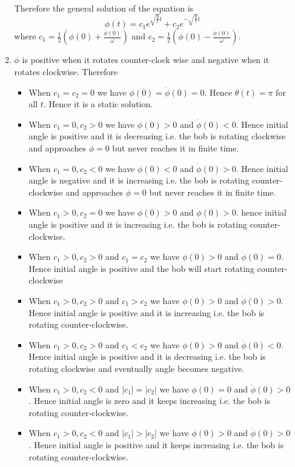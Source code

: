 \documentclass{article}
\begin{document}
\begin{enumerate}
\begin{enumerate}
		\hspace{1cm}Therefore the general solution of the equation is $$\phi(t)=c_1e^{\sqrt{\frac{g}{l}} t}+c_2e^{-\sqrt{\frac{g}{l}} t}$$ where $c_1=\frac12(\phi(0)+\frac{\dot{\phi}(0)}{\omega})$ and $c_2=\frac12(\phi(0)-\frac{\dot{\phi}(0)}{\omega})$.
		\item $\phi$ is positive when it rotates counter-clock wise and negative when it rotates clockwise. Therefore\begin{itemize}
			\item When $c_1=c_2=0$ we have $\phi(0)=\dot{\phi}(0)=0$. Hence $\theta(t)=\pi$  for all $t$. Hence it is a static solution.
			\item When $c_1=0,c_2>0$ we have $\phi(0)>0$ and $\dot{\phi}(0)<0$. Hence initial angle is positive and it is decreasing i.e. the bob is rotating clockwise and approaches $\phi=0$ but never reaches it in finite time.
			\item When $c_1=0,c_2<0$ we have $\phi(0)<0$ and $\dot{\phi}(0)>0$. Hence initial angle is negative and it is increasing i.e. the bob is rotating counter-clockwise and approaches $\phi=0$ but never reaches it in finite time.
			\item When $c_1>0, c_2=0$ we have $\phi(0)>0$ and $\dot{\phi}(0)>0$. hence initial angle is positive and it is increasing i.e. the bob is rotating counter-clockwise.
			\item When $c_1>0, c_2> 0$ and $c_1=c_2$ we have $\phi(0)>0$ and $\dot{\phi}(0)=0$. Hence initial angle is positive and  the bob will start rotating counter-clockwise
			\item When $c_1>0, c_2> 0$ and $c_1> c_2$ we have $\phi(0)>0$ and $\dot{\phi}(0)> 0$. Hence initial angle is positive and it is increasing i.e. the bob is rotating counter-clockwise.
			\item When $c_1>0, c_2> 0$ and $c_1< c_2$ we have $\phi(0)>0$ and $\dot{\phi}(0)<0$. Hence initial angle is positive and it is decreasing i.e. the bob  is rotating clockwise  and eventually angle becomes negative.
			\item When $c_1>0, c_2<0$ and $|c_1|= |c_2|$ we have $\phi(0)=0$ and $\dot{\phi}(0)> 0$. Hence initial angle is zero and it keeps increasing i.e. the bob is rotating counter-clockwise.
			\item When $c_1>0, c_2<0$ and $|c_1|> |c_2|$ we have $\phi(0)>0$ and $\dot{\phi}(0)> 0$. Hence initial angle is positive and it keeps increasing i.e. the bob is rotating counter-clockwise.

\end{itemize}
\end{enumerate}
\end{enumerate}
\end{document}
